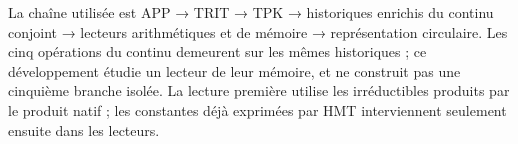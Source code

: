 % 
% 
% 
La chaîne utilisée est APP → TRIT → TPK → historiques enrichis du continu conjoint → lecteurs arithmétiques et de mémoire → représentation circulaire. Les cinq opérations du continu demeurent sur les mêmes historiques ; ce développement étudie un lecteur de leur mémoire, et ne construit pas une cinquième branche isolée. La lecture première utilise les irréductibles produits par le produit natif ; les constantes déjà exprimées par HMT interviennent seulement ensuite dans les lecteurs.

